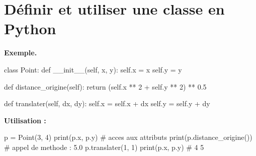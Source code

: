 
\section{Définir et utiliser une classe en Python}



\textbf{Exemple.}
\begin{python}
class Point:
    def __init__(self, x, y):
        self.x = x
        self.y = y

    def distance_origine(self):
        return (self.x ** 2 + self.y ** 2) ** 0.5

    def translater(self, dx, dy):
        self.x = self.x + dx
        self.y = self.y + dy
\end{python}

\textbf{Utilisation :}
\begin{python}
p = Point(3, 4)
print(p.x, p.y)               # acces aux attributs
print(p.distance_origine())   # appel de methode : 5.0
p.translater(1, 1)
print(p.x, p.y)                # 4 5
\end{python}

%

